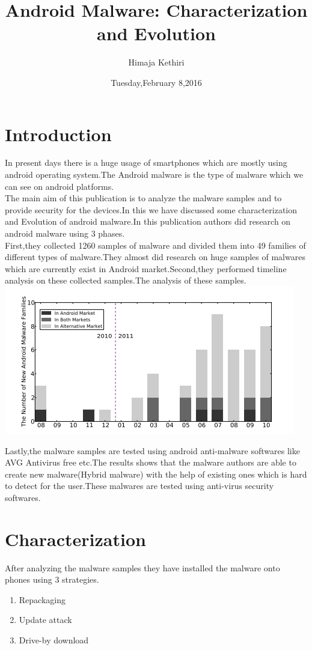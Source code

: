 \documentclass{article}
\title{Android Malware: Characterization and Evolution}
\author{Himaja Kethiri}
\date{Tuesday,February 8,2016}
\begin{document}
\maketitle
\section{Introduction}
In present days there is a huge usage of smartphones which are mostly using android operating system.The Android malware is the type of malware which we can see on android platforms.\\

The main aim of this publication is to analyze the malware samples and to provide security for the devices.In this we have discussed some characterization and Evolution of android malware.In this publication authors did research on android malware using 3 phases.\\

First,they collected 1260 samples of malware and divided them into 49 families of different types of malware.They almost did research on huge samples of malwares which are currently exist in Android market.Second,they performed timeline analysis on these collected samples.The analysis of these samples. \\
\includegraphics{pic.PNG}


Lastly,the malware samples are tested using android anti-malware softwares like AVG Antivirus free  etc.The results shows that the malware authors are able to create new malware(Hybrid malware) with the help of existing ones which is hard to detect for the user.These malwares are tested using anti-virus security softwares.\\

\section{Characterization}
     After analyzing the malware samples they have installed the malware onto phones using 3 strategies. 
\begin{enumerate}
\item Repackaging
\item Update attack
\item Drive-by download
\end{enumerate} 
\end{document}
